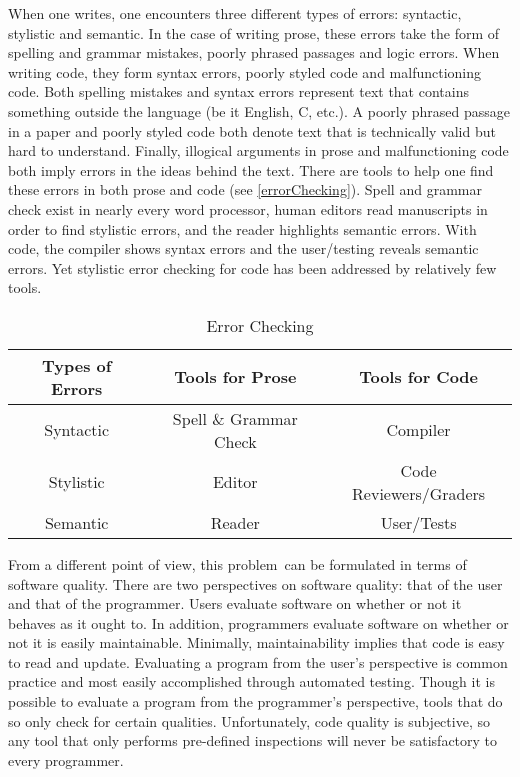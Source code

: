 \documentclass[12pt]{report}
\begin{document}
When one writes, one encounters three different types of errors: syntactic, stylistic and semantic.  
In the case of writing prose, these errors take the form of spelling and grammar mistakes, poorly phrased 
passages and logic errors. When writing code, they form syntax errors, poorly styled code and 
malfunctioning code. Both spelling mistakes and syntax errors represent text that contains something 
outside the language (be it English, C, etc.). A poorly phrased passage in a paper and poorly styled code 
both denote text that is technically valid but hard to understand. Finally, illogical arguments in prose and 
malfunctioning code both imply errors in the ideas behind the text. There are tools to help one find these 
errors in both prose and code (see \autoref{errorChecking}). Spell and grammar check exist in nearly 
every word processor, human editors read manuscripts in order to find stylistic errors, and the reader 
highlights semantic errors. With code, the compiler shows syntax errors and the user\slash testing 
reveals semantic errors. Yet stylistic error checking for code has been addressed by relatively few tools.

\begin{table}%
	\begin{center}
	\begin{tabular}{ccc}
		\toprule
		Types of Errors & Tools for Prose & Tools for Code \\
		\midrule
		Syntactic & Spell \& Grammar Check & Compiler \\
		Stylistic & Editor & Code Reviewers\slash Graders \\ 
		Semantic & Reader & User\slash Tests \\
		\bottomrule
	\end{tabular}
	\end{center}
	\caption{Error Checking}
	\label{errorChecking}
\end{table}


From a different point of view, this problem\ can be formulated in terms of software quality. 
There are two perspectives on software quality: that of the user and that of the programmer. 
Users evaluate software on whether or not it behaves as it ought to. In addition, programmers evaluate 
software on whether or not it is easily maintainable. Minimally, maintainability implies that 
code is easy to read and update. Evaluating a program from the user's perspective is common practice 
and most easily accomplished through automated testing. Though it is possible to evaluate a program 
from the programmer's perspective, tools that do so only check for certain qualities. Unfortunately, code 
quality is subjective, so any tool that only performs pre-defined inspections will never be satisfactory to 
every programmer.
\end{document}
